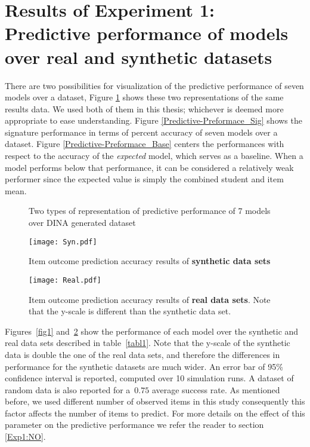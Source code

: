 \section{Results of Experiment 1: Predictive performance of models over real and synthetic datasets} \label{secSyn}

There are two possibilities for visualization of the predictive performance of seven models over a dataset, Figure \ref{Fig:Predictive-Preformace_rep} shows these two representations of the same results data. We used both of them in this thesis; whichever is deemed more appropriate to ease understanding. Figure \ref{Predictive-Preformace_Sig} shows the signature performance in terms of percent accuracy of seven models over a dataset. Figure \ref{Predictive-Preformace_Base} centers the performances with respect to the accuracy of the \textit{expected} model, which serves as a baseline.  When a model performs below that performance, it can be considered a relatively weak performer since the expected value is simply the combined student and item mean.

\begin{figure}[h]
\centering
 \quad
{}
\caption{Two types of representation of predictive performance of 7 models over DINA generated dataset}
\label{Fig:Predictive-Preformace_rep}
\end{figure}


\begin{figure}
\centering
\texttt{[image: Syn.pdf]}
\caption{Item outcome prediction accuracy results of {\textbf{synthetic data sets}}}
\label{fig1}

{\texttt{[image: Real.pdf]}}
\caption{Item outcome prediction accuracy results of {\textbf{real data sets}}.  Note that the y-scale is different than the synthetic data set.}
\label{fig2}
\end{figure}


Figures~\ref{fig1} and~\ref{fig2} show the performance of each model over the synthetic and real data sets described in table~\ref{tabl1}. Note that the y-scale of the synthetic data is double the one of the real data sets, and therefore the differences in performance for the synthetic datasets are much wider.  An error bar of 95\% confidence interval is reported, computed over 10 simulation runs. A dataset of random data is also reported for a~$0.75$ average success rate. As mentioned before, we used different number of observed items in this study consequently this factor affects the number of items to predict. For more details on the effect of this parameter on the predictive performance we refer the reader to section \ref{Exp1:NO}.


